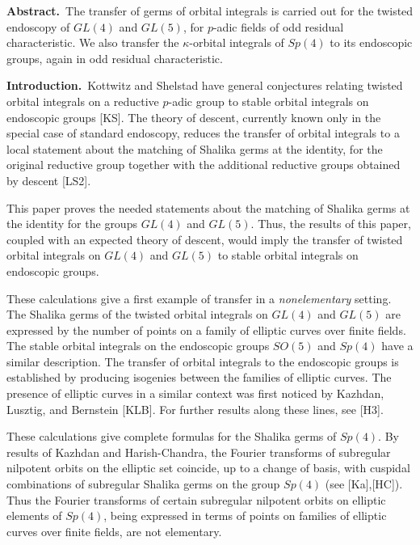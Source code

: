 \noindent
{\bf Abstract.}\   The transfer of germs of orbital integrals 
is carried out for the twisted endoscopy of $GL(4)$ and
$GL(5)$, for $p$-adic fields of odd  residual characteristic.
We also transfer the $\kappa$-orbital integrals of $Sp(4)$
to its endoscopic groups, again in odd residual characteristic.

\bigskip

\noindent
{\bf Introduction.}\   Kottwitz and Shelstad have general
conjectures relating twisted orbital integrals on a reductive
$p$-adic group to stable orbital integrals on endoscopic groups [KS].
The theory of descent, currently known only in the special
case of standard endoscopy, reduces the transfer of orbital
integrals to a local statement about the matching of Shalika
germs at the identity, for the original reductive group
together with the additional reductive groups obtained 
by descent [LS2].

This paper proves the needed statements about the matching
of Shalika germs at the identity for the groups $GL(4)$ and
$GL(5)$.  Thus, the results of this paper, coupled with
an expected theory of descent, would imply the transfer of
twisted orbital integrals on $GL(4)$ and $GL(5)$ to stable
orbital integrals on endoscopic groups.

These calculations give a first example of transfer in 
a {\it nonelementary} setting.  The Shalika germs of the
twisted orbital integrals on $GL(4)$ and $GL(5)$ 
are expressed
by the number of points on a family of elliptic curves over
finite fields.  The stable orbital integrals on the endoscopic
groups $SO(5)$ and $Sp(4)$ have a similar description.
The transfer of orbital integrals to the
endoscopic groups is established by producing isogenies
between the families of elliptic curves.  
The presence of elliptic curves in a similar context
was first noticed by
Kazhdan, Lusztig, and Bernstein [KLB].  For further 
results along these lines, see [H3].

These calculations  give complete formulas for the
Shalika germs of $Sp(4)$.  
By results of Kazhdan and Harish-Chandra, the Fourier
transforms of subregular nilpotent orbits on the elliptic set coincide,
up to a change of basis, with cuspidal combinations
of subregular Shalika germs
on the group $Sp(4)$ (see [Ka],[HC]). 
Thus the Fourier transforms of certain subregular
nilpotent orbits on elliptic elements of
$Sp(4)$, being
expressed in terms of
points on families of elliptic curves over finite fields,
are not elementary.

